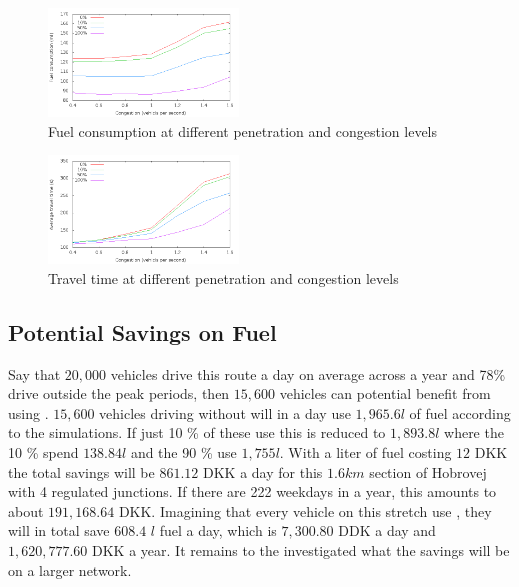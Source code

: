 \begin{figure}[htb]
\includegraphics[width=0.45\textwidth]{../images/fuelCongestion.png}
\caption{Fuel consumption at different penetration and congestion levels}
\label{fig:TestResults:congestionFuel}
\end{figure}
\begin{figure}[htb]
\includegraphics[width=0.45\textwidth]{../images/timeCongestion.png}
\caption{Travel time at different penetration and congestion levels}
\label{fig:TestResults:congestionTime}
\end{figure}

\subsection{Potential Savings on Fuel}
Say that $20,000$ vehicles drive this route a day on average across a year and 78\% drive outside the peak periods, then $15,600$ vehicles can potential benefit from using \tech.
$15,600$ vehicles driving without \tech will in a day use $1,965.6 l$ of fuel according to the simulations.
If just 10 \% of these use \tech this is reduced to $1,893.8 l$ where the 10 \% spend $138.84 l$ and the 90 \% use $1,755 l$.
With a liter of fuel costing $12$ DKK the total savings will be $861.12$ DKK a day for this $1.6 km$ section of Hobrovej with 4 regulated junctions.
If there are 222 weekdays in a year, this amounts to about $191,168.64$ DKK.
Imagining that every vehicle on this stretch use \tech, they will in total save $608.4$ $l$ fuel a day, which is $7,300.80$ DDK a day and $1,620,777.60$ DKK a year.
It remains to the investigated what the savings will be on a larger network.



